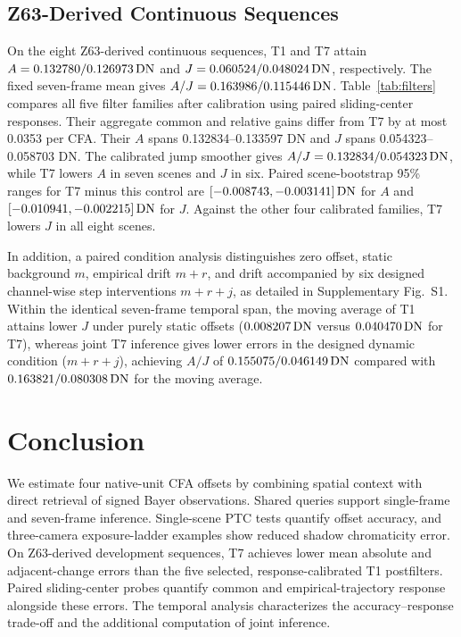 \subsection{Z63-Derived Continuous Sequences}
On the eight Z63-derived continuous sequences, T1 and T7 attain $A=0.132780/0.126973\,\mathrm{DN}$ and $J=0.060524/0.048024\,\mathrm{DN}$, respectively. The fixed seven-frame mean gives $A/J=0.163986/0.115446\,\mathrm{DN}$. Table~\ref{tab:filters} compares all five filter families after calibration using paired sliding-center responses. Their aggregate common and relative gains differ from T7 by at most 0.0353 per CFA. Their $A$ spans 0.132834--0.133597 DN and $J$ spans 0.054323--0.058703 DN. The calibrated jump smoother gives $A/J=0.132834/0.054323\,\mathrm{DN}$, while T7 lowers $A$ in seven scenes and $J$ in six. Paired scene-bootstrap 95\% ranges for T7 minus this control are $[-0.008743,-0.003141]\,\mathrm{DN}$ for $A$ and $[-0.010941,-0.002215]\,\mathrm{DN}$ for $J$. Against the other four calibrated families, T7 lowers $J$ in all eight scenes.


In addition, a paired condition analysis distinguishes zero offset, static background $m$, empirical drift $m+r$, and drift accompanied by six designed channel-wise step interventions $m+r+j$, as detailed in Supplementary Fig.~S1. Within the identical seven-frame temporal span, the moving average of T1 attains lower $J$ under purely static offsets ($0.008207\,\mathrm{DN}$ versus $0.040470\,\mathrm{DN}$ for T7), whereas joint T7 inference gives lower errors in the designed dynamic condition ($m+r+j$), achieving $A/J$ of $0.155075/0.046149\,\mathrm{DN}$ compared with $0.163821/0.080308\,\mathrm{DN}$ for the moving average.

\section{Conclusion}
We estimate four native-unit CFA offsets by combining spatial context with direct retrieval of signed Bayer observations. Shared queries support single-frame and seven-frame inference. Single-scene PTC tests quantify offset accuracy, and three-camera exposure-ladder examples show reduced shadow chromaticity error. On Z63-derived development sequences, T7 achieves lower mean absolute and adjacent-change errors than the five selected, response-calibrated T1 postfilters. Paired sliding-center probes quantify common and empirical-trajectory response alongside these errors. The temporal analysis characterizes the accuracy--response trade-off and the additional computation of joint inference.



